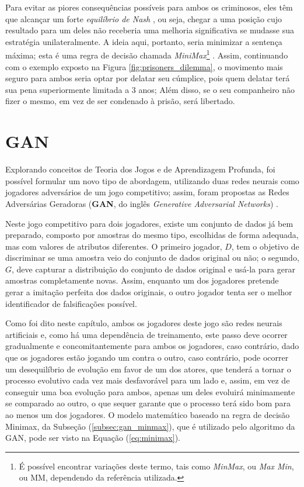 Para evitar as piores consequências possíveis para ambos os criminosos, eles têm que alcançar um forte \textit{equilíbrio de Nash} \citep{Nash48}, ou seja, chegar a uma posição cujo resultado para um deles não receberia uma melhoria significativa se mudasse sua estratégia unilateralmente. A ideia aqui, portanto, seria minimizar a sentença máxima; esta é uma regra de decisão chamada \textit{MiniMax}\footnote{É possível encontrar variações deste termo, tais como \textit{MinMax}, ou \textit{Max Min}, ou MM, dependendo da referência utilizada.} \citep{v.Neumann1928, blackwell1956analog, willem1997minimax}. Assim, continuando com o exemplo exposto na Figura \ref{fig:prisoners_dilemma}, o movimento mais seguro para ambos seria optar por delatar seu cúmplice, pois quem delatar terá sua pena superiormente limitada a 3 anos; Além disso, se o seu companheiro não fizer o mesmo, em vez de ser condenado à prisão, será libertado.



\section{GAN}
\label{sec:gan_gan}

Explorando conceitos de Teoria dos Jogos e de Aprendizagem Profunda, foi possível formular um novo tipo de abordagem, utilizando duas redes neurais como jogadores adversários de um jogo competitivo; assim, foram propostas as Redes Adversárias Geradoras (\textbf{GAN}, do inglês \textit{Generative Adversarial Networks}) \citep{NIPS2014_5423}.

Neste jogo competitivo para dois jogadores, existe um conjunto de dados já bem preparado, composto por amostras do mesmo tipo, escolhidas de forma adequada, mas com valores de atributos diferentes. O primeiro jogador, $D$, tem o objetivo de discriminar se uma amostra veio do conjunto de dados original ou não; o segundo, $G$, deve capturar a distribuição do conjunto de dados original e usá-la para gerar amostras completamente novas. Assim, enquanto um dos jogadores pretende gerar a imitação perfeita dos dados originais, o outro jogador tenta ser o melhor identificador de falsificações possível.

Como foi dito neste capítulo, ambos os jogadores deste jogo são redes neurais artificiais e, como há uma dependência de treinamento, este passo deve ocorrer gradualmente e concomitantemente para ambos os jogadores, caso contrário, dado que os jogadores estão jogando um contra o outro, caso contrário, pode ocorrer um desequilíbrio de evolução em favor de um dos atores, que tenderá a tornar o processo evolutivo cada vez mais desfavorável para um lado e, assim, em vez de conseguir uma boa evolução para ambos, apenas um deles evoluirá minimamente se comparado ao outro, o que sequer garante que o processo terá sido bom para ao menos um dos jogadores. O modelo matemático baseado na regra de decisão Minimax, da Subseção (\ref{subsec:gan_minmax}), que é utilizado pelo algoritmo da GAN, pode ser visto na Equação (\ref{eq:minimax}).

